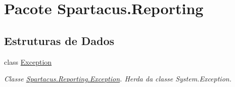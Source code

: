 \hypertarget{namespaceSpartacus_1_1Reporting}{\section{Pacote Spartacus.\+Reporting}
\label{namespaceSpartacus_1_1Reporting}
}
\subsection*{Estruturas de Dados}
\begin{DoxyCompactItemize}
\item 
class \hyperlink{classSpartacus_1_1Reporting_1_1Exception}{Exception}
\begin{DoxyCompactList}\small\item\em Classe \hyperlink{classSpartacus_1_1Reporting_1_1Exception}{Spartacus.\+Reporting.\+Exception}. Herda da classe System.\+Exception. \end{DoxyCompactList}\end{DoxyCompactItemize}
